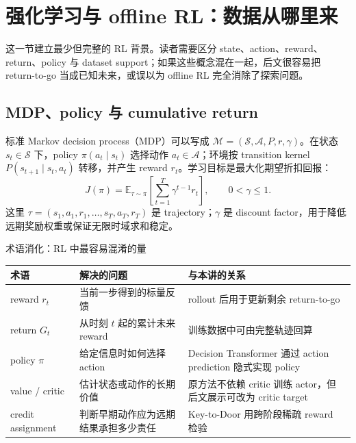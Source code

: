\section{强化学习与 offline RL：数据从哪里来}

这一节建立最少但完整的 RL 背景。读者需要区分 state、action、reward、return、policy 与 dataset support；如果这些概念混在一起，后文很容易把 return-to-go 当成已知未来，或误以为 offline RL 完全消除了探索问题。

\subsection{MDP、policy 与 cumulative return}

标准 Markov decision process（MDP）可以写成 $\mathcal{M}=(\mathcal{S},\mathcal{A},P,r,\gamma)$。在状态 $s_t\in\mathcal{S}$ 下，policy $\pi(a_t\mid s_t)$ 选择动作 $a_t\in\mathcal{A}$；环境按 transition kernel $P(s_{t+1}\mid s_t,a_t)$ 转移，并产生 reward $r_t$。学习目标是最大化期望折扣回报：
\[
J(\pi)=\mathbb{E}_{\tau\sim\pi}\left[\sum_{t=1}^{T}\gamma^{t-1}r_t\right],
\qquad 0<\gamma\le 1.
\]
这里 $\tau=(s_1,a_1,r_1,\ldots,s_T,a_T,r_T)$ 是 trajectory；$\gamma$ 是 discount factor，用于降低远期奖励权重或保证无限时域求和稳定。


\begin{knowledgebox}{术语消化：RL 中最容易混淆的量}
\begin{tabularx}{\textwidth}{L{2.8cm} X X}
\toprule
术语 & 解决的问题 & 与本讲的关系 \\
\midrule
reward $r_t$ & 当前一步得到的标量反馈 & rollout 后用于更新剩余 return-to-go \\
return $G_t$ & 从时刻 $t$ 起的累计未来 reward & 训练数据中可由完整轨迹回算 \\
policy $\pi$ & 给定信息时如何选择 action & Decision Transformer 通过 action prediction 隐式实现 policy \\
value / critic & 估计状态或动作的长期价值 & 原方法不依赖 critic 训练 actor，但后文展示可改为 critic target \\
credit assignment & 判断早期动作应为远期结果承担多少责任 & Key-to-Door 用跨阶段稀疏 reward 检验 \\
\bottomrule
\end{tabularx}
\end{knowledgebox}

